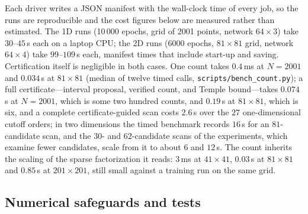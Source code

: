 \vspace{0.3em}\noindent Each driver writes a JSON manifest with the wall-clock time of every job, so
the runs are reproducible and the cost figures below are measured rather than
estimated. The 1D runs (10\,000 epochs, grid of 2001 points, network
$64\times3$) take $30$--$45$\,s each on a laptop CPU; the 2D runs
($6000$ epochs, $81\times81$ grid, network $64\times4$) take $99$--$109$\,s
each, manifest times that include start-up and saving.
Certification itself is negligible in both cases. One count
takes $0.4$\,ms at $N=2001$ and $0.034$\,s at $81\times81$ (median of twelve
timed calls, \texttt{scripts/bench\_count.py}); a full certificate---interval
proposal, verified count, and Temple bound---takes $0.074$\,s at $N=2001$,
which is some two hundred counts, and $0.19$\,s at $81\times81$, which is six,
and a complete certificate-guided scan costs $2.6$\,s over the $27$
one-dimensional cutoff orders; in two dimensions the timed benchmark records
$16$\,s for an $81$-candidate scan, and the $30$- and $62$-candidate scans of
the experiments, which examine fewer candidates, scale from it to about $6$
and $12$\,s. The count inherits
the scaling of the sparse factorization it reads: $3$\,ms at $41\times41$,
$0.03$\,s at $81\times81$ and $0.85$\,s at $201\times201$, still small
against a training run on the same grid.

\subsection{Numerical safeguards and tests}

